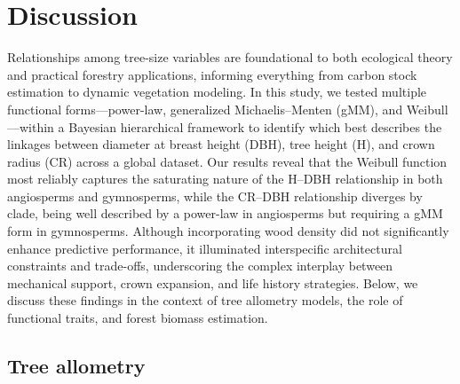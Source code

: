 \documentclass[
  12pt,
  letterpaper,
  DIV=11,
  numbers=noendperiod]{scrartcl}
\begin{document}
\section{Discussion}\label{discussion}

Relationships among tree-size variables are foundational to both
ecological theory and practical forestry applications, informing
everything from carbon stock estimation to dynamic vegetation modeling.
In this study, we tested multiple functional forms---power-law,
generalized Michaelis--Menten (gMM), and Weibull---within a Bayesian
hierarchical framework to identify which best describes the linkages
between diameter at breast height (DBH), tree height (H), and crown
radius (CR) across a global dataset. Our results reveal that the Weibull
function most reliably captures the saturating nature of the H--DBH
relationship in both angiosperms and gymnosperms, while the CR--DBH
relationship diverges by clade, being well described by a power-law in
angiosperms but requiring a gMM form in gymnosperms. Although
incorporating wood density did not significantly enhance predictive
performance, it illuminated interspecific architectural constraints and
trade-offs, underscoring the complex interplay between mechanical
support, crown expansion, and life history strategies. Below, we discuss
these findings in the context of tree allometry models, the role of
functional traits, and forest biomass estimation.

\subsection{Tree allometry}\label{tree-allometry}
\end{document}

